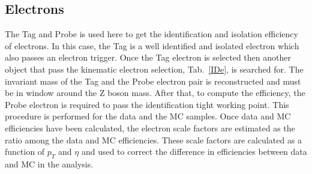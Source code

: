 \subsection*{Electrons} 
The   Tag and Probe is used here to get the identification and isolation efficiency of electrons. In this case, the Tag is a
well identified and isolated electron which also passes an electron trigger. 
Once the Tag electron is selected then another object that pass the kinematic electron selection, Tab.~\ref{IDe}, is searched for. 
The invariant  mass of the Tag and the Probe electron pair is reconstructed and must be in window around the Z boson mass. 
After that, to compute the efficiency, the Probe electron is required  to pass the identification tight working point. 
This procedure is performed for the data and the MC samples. 
Once data and MC efficiencies have been calculated, the electron scale factors are estimated as the ratio among the data and MC efficiencies.  
These scale factors are calculated as a function of $p_T$ and $\eta$ and used to correct the difference in efficiencies between data and MC in the analysis. 

